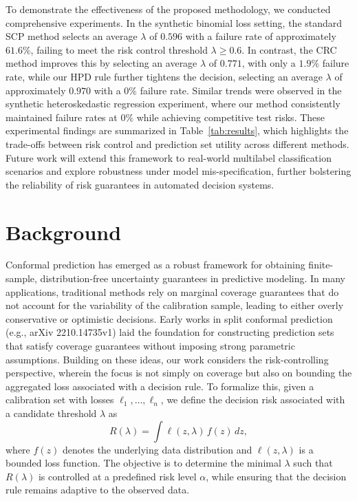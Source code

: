 \documentclass{article}
\begin{document}
To demonstrate the effectiveness of the proposed methodology, we conducted comprehensive experiments. In the synthetic binomial loss setting, the standard SCP method selects an average $\lambda$ of $0.596$ with a failure rate of approximately $61.6\%$, failing to meet the risk control threshold $\lambda \geq 0.6$. In contrast, the CRC method improves this by selecting an average $\lambda$ of $0.771$, with only a $1.9\%$ failure rate, while our HPD rule further tightens the decision, selecting an average $\lambda$ of approximately $0.970$ with a $0\%$ failure rate. Similar trends were observed in the synthetic heteroskedastic regression experiment, where our method consistently maintained failure rates at $0\%$ while achieving competitive test risks. These experimental findings are summarized in Table~\ref{tab:results}, which highlights the trade-offs between risk control and prediction set utility across different methods. Future work will extend this framework to real-world multilabel classification scenarios and explore robustness under model mis-specification, further bolstering the reliability of risk guarantees in automated decision systems.

\section{Background}
Conformal prediction has emerged as a robust framework for obtaining finite-sample, distribution‐free uncertainty guarantees in predictive modeling. In many applications, traditional methods rely on marginal coverage guarantees that do not account for the variability of the calibration sample, leading to either overly conservative or optimistic decisions. Early works in split conformal prediction (e.g., arXiv 2210.14735v1) laid the foundation for constructing prediction sets that satisfy coverage guarantees without imposing strong parametric assumptions. Building on these ideas, our work considers the risk-controlling perspective, wherein the focus is not simply on coverage but also on bounding the aggregated loss associated with a decision rule. To formalize this, given a calibration set with losses $\ell_1, \dots, \ell_n$, we define the decision risk associated with a candidate threshold $\lambda$ as
\[
R(\lambda) = \int \ell(z,\lambda) \, f(z)\,dz,
\]
where $f(z)$ denotes the underlying data distribution and $\ell(z,\lambda)$ is a bounded loss function. The objective is to determine the minimal $\lambda$ such that $R(\lambda)$ is controlled at a predefined risk level $\alpha$, while ensuring that the decision rule remains adaptive to the observed data.
\end{document}
